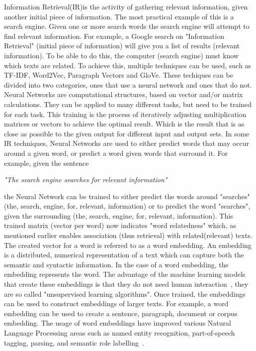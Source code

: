\documentclass[../../Thesis.tex]{subfiles}
\begin{document}
Information Retrieval(IR)is the activity of gathering relevant information, given another initial piece of information. The most practical example of this is a search engine. Given one or more search words the search engine will attempt to find relevant information. For example, a Google search on "Information Retrieval" (initial piece of information) will give you a list of results (relevant information). To be able to do this, the computer (search engine) must know which texts are related. To achieve this, multiple techniques can be used, such as TF-IDF, Word2Vec, Paragraph Vectors and GloVe. These techiques can be divided into two categories, ones that use a neural network and ones that do not.
Neural Networks are computational structures, based on vector and/or matrix calculations. They can be applied to many different tasks, but need to be trained for each task. This training is the process of iteratively adjusting multiplication matrices or vectors to achieve the optimal result. Which is the result that is as close as possible to the given output for different input and output sets.
In some IR techniques, Neural Networks are used to either predict words that may occur around a given word, or predict a word given words that surround it. For example, given the sentence\\
\begin{center}
\textit{"The search engine searches for relevant information"}
\end{center}
the Neural Network can be trained to either predict the words around "searches" (the, search, engine, for, relevant, information) or to predict the word "searches", given the surrounding (the, search, engine, for, relevant, information). This trained matrix (vector per word) now indicates "word relatedness" which, as mentioned earlier enables association (thus retrieval) with related(relevant) texts.
The created vector for a word is referred to as a word embedding. An embedding is a distributed, numerical representation of a text which can capture both the semantic and syntactic information\cite{mikolov2013distributed}. In the case of a word embedding, the embedding represents the word. The advantage of the machine learning models that create these embeddings is that they do not need human interaction~\citet{lai2016generate}, they are so called "unsupervised learning algorithms". Once trained, the embeddings can be used to construct embeddings of larger texts. For example, a word embedding can be used to create a sentence, paragraph, document or corpus embedding. The usage of word embeddings have improved various Natural Language Processing areas such as named entity recognition, part-of-speech tagging, parsing, and semantic role labelling~\citet{luong2013better}.
\end{document}
